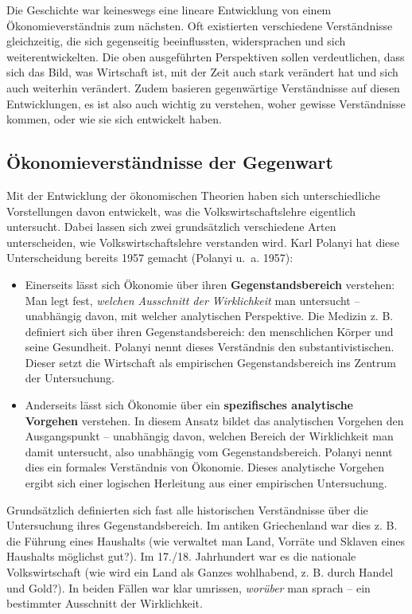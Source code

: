 \documentclass[
  nswissgerman,
  a4paper,
  DIV=11,
  numbers=noendperiod,
  oneside,
  openany]{scrreprt}
\begin{document}
Die Geschichte war keineswegs eine lineare Entwicklung von einem
Ökonomieverständnis zum nächsten. Oft existierten verschiedene
Verständnisse gleichzeitig, die sich gegenseitig beeinflussten,
widersprachen und sich weiterentwickelten. Die oben ausgeführten
Perspektiven sollen verdeutlichen, dass sich das Bild, was Wirtschaft
ist, mit der Zeit auch stark verändert hat und sich auch weiterhin
verändert. Zudem basieren gegenwärtige Verständnisse auf diesen
Entwicklungen, es ist also auch wichtig zu verstehen, woher gewisse
Verständnisse kommen, oder wie sie sich entwickelt haben.

\subsection{Ökonomieverständnisse der
Gegenwart}\label{uxf6konomieverstuxe4ndnisse-der-gegenwart}

Mit der Entwicklung der ökonomischen Theorien haben sich
unterschiedliche Vorstellungen davon entwickelt, was die
Volkswirtschaftslehre eigentlich untersucht. Dabei lassen sich zwei
grundsätzlich verschiedene Arten unterscheiden, wie
Volkswirtschaftslehre verstanden wird. Karl Polanyi hat diese
Unterscheidung bereits 1957 gemacht (Polanyi u.~a. 1957):

\begin{itemize}
\item
  Einerseits lässt sich Ökonomie über ihren \textbf{Gegenstandsbereich}
  verstehen: Man legt fest, \emph{welchen Ausschnitt der Wirklichkeit}
  man untersucht -- unabhängig davon, mit welcher analytischen
  Perspektive. Die Medizin z. B. definiert sich über ihren
  Gegenstandsbereich: den menschlichen Körper und seine Gesundheit.
  Polanyi nennt dieses Verständnis den substantivistischen. Dieser setzt
  die Wirtschaft als empirischen Gegenstandsbereich ins Zentrum der
  Untersuchung.
\item
  Anderseits lässt sich Ökonomie über ein \textbf{spezifisches
  analytische Vorgehen} verstehen. In diesem Ansatz bildet das
  analytischen Vorgehen den Ausgangspunkt -- unabhängig davon, welchen
  Bereich der Wirklichkeit man damit untersucht, also unabhängig vom
  Gegenstandsbereich. Polanyi nennt dies ein formales Verständnis von
  Ökonomie. Dieses analytische Vorgehen ergibt sich einer logischen
  Herleitung aus einer empirischen Untersuchung.
\end{itemize}

Grundsätzlich definierten sich fast alle historischen Verständnisse über
die Untersuchung ihres Gegenstandsbereich. Im antiken Griechenland war
dies z. B. die Führung eines Haushalts (wie verwaltet man Land, Vorräte
und Sklaven eines Haushalts möglichst gut?). Im 17./18. Jahrhundert war
es die nationale Volkswirtschaft (wie wird ein Land als Ganzes
wohlhabend, z. B. durch Handel und Gold?). In beiden Fällen war klar
umrissen, \emph{worüber} man sprach -- ein bestimmter Ausschnitt der
Wirklichkeit.
\end{document}
